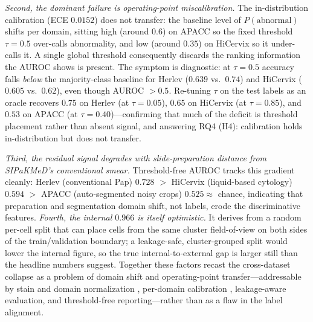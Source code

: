\emph{Second, the dominant failure is operating-point miscalibration.} The in-distribution calibration (ECE $0.0152$) does not transfer: the baseline level of $P(\text{abnormal})$ shifts per domain, sitting high (around $0.6$) on APACC so the fixed threshold $\tau=0.5$ over-calls abnormality, and low (around $0.35$) on HiCervix so it under-calls it. A single global threshold consequently discards the ranking information the AUROC shows is present. The symptom is diagnostic: at $\tau=0.5$ accuracy falls \emph{below} the majority-class baseline for Herlev ($0.639$ vs.\ $0.74$) and HiCervix ($0.605$ vs.\ $0.62$), even though AUROC $>0.5$. Re-tuning $\tau$ on the test labels as an oracle recovers $0.75$ on Herlev (at $\tau=0.05$), $0.65$ on HiCervix (at $\tau=0.85$), and $0.53$ on APACC (at $\tau=0.40$)---confirming that much of the deficit is threshold placement rather than absent signal, and answering RQ4 (H4): calibration holds in-distribution but does not transfer.

\emph{Third, the residual signal degrades with slide-preparation distance from SIPaKMeD's conventional smear.} Threshold-free AUROC tracks this gradient cleanly: Herlev (conventional Pap) $0.728$ $>$ HiCervix (liquid-based cytology) $0.594$ $>$ APACC (auto-segmented noisy crops) $0.525\approx$ chance, indicating that preparation and segmentation domain shift, not labels, erode the discriminative features. \emph{Fourth, the internal $0.966$ is itself optimistic.} It derives from a random per-cell split that can place cells from the same cluster field-of-view on both sides of the train/validation boundary; a leakage-safe, cluster-grouped split would lower the internal figure, so the true internal-to-external gap is larger still than the headline numbers suggest. Together these factors recast the cross-dataset collapse as a problem of domain shift and operating-point transfer---addressable by stain and domain normalization \citep{macenko2009stain}, per-domain calibration \citep{guo2017calibration}, leakage-aware evaluation, and threshold-free reporting---rather than as a flaw in the label alignment.